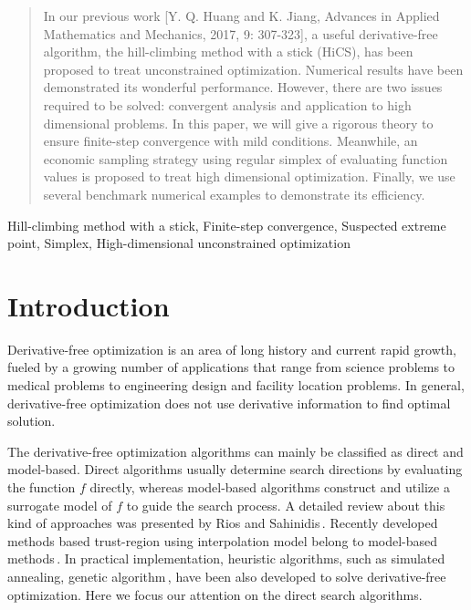 \documentclass[final,1p,times]{elsarticle}
\begin{document}
\begin{frontmatter}
\begin{abstract}
In our previous work [Y. Q. Huang and K. Jiang, Advances in
Applied Mathematics and Mechanics, 2017, 9: 307-323], a useful
derivative-free algorithm, the hill-climbing method with a stick (HiCS), has
been proposed to treat unconstrained optimization. Numerical
results have been demonstrated its wonderful performance.
However, there are two issues required to be solved: convergent
analysis and application to high dimensional problems. 
In this paper, we will give a rigorous theory to ensure finite-step
convergence with mild conditions. Meanwhile, an economic sampling
strategy using regular simplex of evaluating function values is
proposed to treat high dimensional optimization. Finally, we use
several benchmark numerical examples to demonstrate its efficiency.
\end{abstract}

\begin{keyword}
Hill-climbing method with a stick, Finite-step convergence,
Suspected extreme point, Simplex, 
High-dimensional unconstrained optimization
\end{keyword}

\end{frontmatter}


\section{Introduction}
\label{sec:intro}

Derivative-free optimization is an area of long history and
current rapid growth, fueled by a growing number of applications
that range from science problems to medical problems to
engineering design and facility location problems. 
In general, derivative-free optimization  does not use derivative
information to find optimal solution. 

The derivative-free optimization algorithms can mainly be
classified as direct and model-based.  Direct algorithms usually
determine search directions by evaluating the
function $f$ directly, whereas model-based algorithms construct
and utilize a surrogate model of $f$ to guide the search process.
A detailed review about this kind of approaches was presented by
Rios and Sahinidis\,\cite{rios2013derivative}.
Recently developed methods based trust-region using
interpolation model belong to model-based methods\,\cite{powell2000uobyqa,
powell2002trust, wu2009heuristic, zhang2014sobolev}. 
In practical implementation, heuristic algorithms, such as
simulated annealing, genetic algorithm\,\cite{michalewicz2004how}, 
have been also developed to solve derivative-free optimization.
Here we focus our attention on the direct search algorithms.
\end{document}
